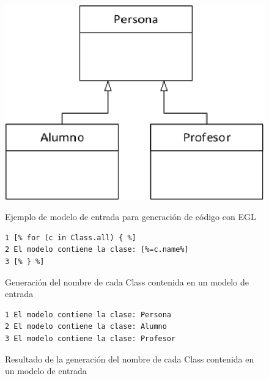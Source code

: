 \begin{figure}[!tb]
  \centering
	\includegraphics[width=.95\linewidth]{background/images/epsilonEGL.eps} \\
  \caption{Ejemplo de modelo de entrada para generación de código con EGL}
  \label{back:fig:epsilonEGL}
\end{figure}

\begin{figure}[tb!]
\begin{center}
\begin{footnotesize}
\begin{verbatim}
1 [% for (c in Class.all) { %]
2 El modelo contiene la clase: [%=c.name%]
3 [% } %]
\end{verbatim}
\end{footnotesize}
\end{center}
\caption{Generación del nombre de cada Class contenida en un modelo de entrada}
\label{back:code:generacionClases}
\end{figure}

\begin{figure}[tb!]
\begin{center}
\begin{footnotesize}
\begin{verbatim}
1 El modelo contiene la clase: Persona
2 El modelo contiene la clase: Alumno
3 El modelo contiene la clase: Profesor
\end{verbatim}
\end{footnotesize}
\end{center}
\caption{Resultado de la generación del nombre de cada Class contenida en un modelo de entrada}
\label{back:code:resultadogeneracionClases}
\end{figure}

